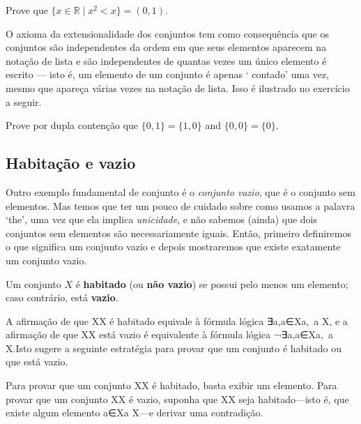 \begin{exercise}
Prove que $\{ x \in \mathbb{R} \mid x^2 < x \} = (0,1)$.
\end{exercise}

O axioma da extensionalidade dos conjuntos tem como consequência que os conjuntos são independentes da ordem em que seus elementos aparecem na notação de lista e são independentes de quantas vezes um único elemento é escrito --- isto é, um elemento de um conjunto é apenas ` contado' uma vez, mesmo que apareça várias vezes na notação de lista. Isso é ilustrado no exercício a seguir.

\begin{exercise}
Prove por dupla contenção que $\{ 0, 1 \} = \{ 1, 0 \}$ and $\{ 0, 0 \} = \{ 0 \}$.
\end{exercise}

\subsection*{Habitação e vazio}

Outro exemplo fundamental de conjunto é o \textit{conjunto vazio}, que é o conjunto sem elementos. Mas temos que ter um pouco de cuidado sobre como usamos a palavra `the', uma vez que ela implica \textit{unicidade}, e não sabemos (ainda) que dois conjuntos sem elementos são necessariamente iguais. Então, primeiro definiremos o que significa um conjunto vazio e depois mostraremos que existe exatamente um conjunto vazio.

\begin{definition}
\label{defInhabited}
\label{defEmptyProperty}
Um conjunto $X$ é \textbf{habitado} (ou \textbf{não vazio}) se possui pelo menos um elemento; caso contrário, está \textbf{vazio}.
\end{definition}

A afirmação de que XX é habitado equivale à fórmula lógica ∃a,a∈X\exists a,\, a \in X, e a afirmação de que XX está vazio é equivalente à fórmula lógica ¬∃a,a∈X\neg \exists a,\, a \in X.Isto sugere a seguinte estratégia para provar que um conjunto é habitado ou que está vazio.

\begin{strategy}
Para provar que um conjunto XX é habitado, basta exibir um elemento. Para provar que um conjunto XX é vazio, suponha que XX seja habitado---isto é, que existe algum elemento a∈Xa \in X---e derivar uma contradição.
\end{strategy}

